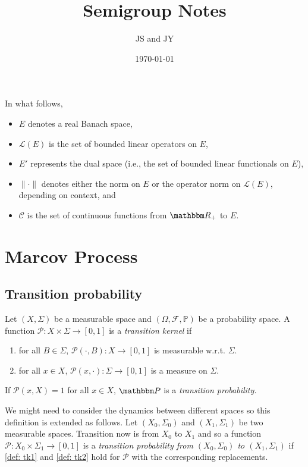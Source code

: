 \documentclass[12pt, reqno]{amsart}
\newcommand{\1}{\mathbbm 1}
\newcommand{\cC}{\mathscr C}
\newcommand{\lL}{\mathcal L}
\newcommand{\pP}{\mathcal P}
\newcommand{\RR}{\mathbbm R}
\newcommand{\PP}{\mathbbm P}
\theoremstyle{plain}
\theoremstyle{definition}
\begin{document}
\title{Semigroup Notes}

\author{JS and JY}

\date{\today}

\maketitle


In what follows, 

\begin{itemize}
    \item $E$ denotes a real Banach space,
    \item $\lL(E)$ is the set of bounded linear operators on $E$,
    \item $E'$ represents the dual space (i.e., the set of bounded linear
        functionals on $E$),
    \item $\| \cdot \|$ denotes either the norm on $E$ or the operator norm on
        $\lL(E)$, depending on context, and
    \item $\cC$ is the set of continuous functions from $\RR_+$ to $E$.
\end{itemize}

\section{Marcov Process}
\subsection{Transition probability}
Let $(X,\Sigma)$ be a measurable space and $(\Omega,\mathcal{F},\mathbb{P})$ be a probability space. A function $\pP\colon X\times \Sigma\rightarrow [0,1]$ is a \emph{transition kernel} if
\begin{enumerate} 
	\item\label{def: tk1} for all $B\in\Sigma$, $\pP(\cdot ,B)\colon X\rightarrow [0,1]$ is measurable w.r.t. $\Sigma.$
	\item \label{def: tk2}for all $x\in X$, $\pP(x,\cdot )\colon \Sigma\rightarrow [0,1]$ is a measure on $\Sigma.$
\end{enumerate}
If $\pP(x,X)=1$ for all $x\in X$, $\PP$ is a \emph{transition probability.} 

 We might need to consider the dynamics between different spaces so this definition is extended as follows. Let $(X_0,\Sigma_0)$ and  $(X_1,\Sigma_1)$ be two measurable spaces. Transition now is from $X_0$ to $X_1$ and so a function $\pP\colon X_0\times \Sigma_1\rightarrow [0,1]$ is a \emph{transition probability from $(X_0,\Sigma_0)$ to $(X_1,\Sigma_1)$ } if \ref{def: tk1} and \ref{def: tk2} hold for $\pP$ with the corresponding replacements.
 
\end{document}
